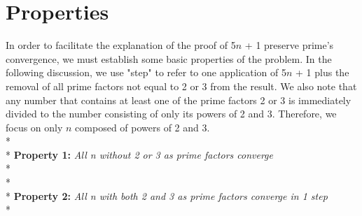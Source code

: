 \documentclass{article}
\begin{document}
\section{Properties}
In order to facilitate the explanation of the proof of 5$n$ + 1 preserve prime's convergence, we must establish some basic properties of the problem. In the following discussion, we use "step" to refer to one application of 5$n$ + 1 plus the removal of all prime factors not equal to 2 or 3 from the result. We also note that any number that contains at least one of the prime factors 2 or 3 is immediately divided to the number consisting of only its powers of 2 and 3. Therefore, we focus on only $n$ composed of powers of 2 and 3. \\*\\*
\large{\textbf{Property 1:}} \textit{All n without 2 or 3 as prime factors converge}\\*
\\*
\\*
\large{\textbf{Property 2:}} \textit{All n with both 2 and 3 as prime factors converge in 1 step}\\*
\end{document}
